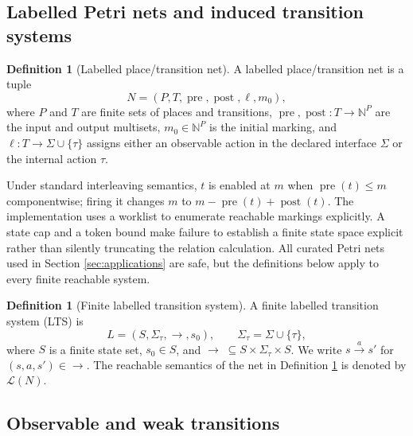 \documentclass[JMCS,submit]{resources/ISRP}
\theoremstyle{definition}
\newtheorem{definition}[theorem]{Definition}
\theoremstyle{remark}
\numberwithin{equation}{section}
\newcommand{\TAU}{\tau}
\newcommand{\LTS}{\mathcal{L}}
\begin{document}
\subsection{Labelled Petri nets and induced transition systems}
\label{sec:petri}

\begin{definition}[Labelled place/transition net]\label{def:petri-net}
A labelled place/transition net is a tuple
\begin{equation}\label{eq:petri-net}
 N=(P,T,\operatorname{pre},\operatorname{post},\ell,m_0),
\end{equation}
where $P$ and $T$ are finite sets of places and transitions,
$\operatorname{pre},\operatorname{post}:T\to\mathbb{N}^{P}$ are the input and
output multisets, $m_0\in\mathbb{N}^{P}$ is the initial marking, and
$\ell:T\to\Sigma\cup\{\TAU\}$ assigns either an observable action in the declared
interface $\Sigma$ or the internal action $\TAU$.
\end{definition}

Under standard interleaving semantics, $t$ is enabled at $m$ when
$\operatorname{pre}(t)\leq m$ componentwise; firing it changes $m$ to
$m-\operatorname{pre}(t)+\operatorname{post}(t)$. The implementation uses
a worklist to enumerate reachable markings explicitly. A state cap and a token
bound make failure to establish a finite state space explicit rather than silently
truncating the relation calculation. All curated Petri nets used in Section
\ref{sec:applications} are safe, but the definitions below apply to every finite
reachable system.

\begin{definition}[Finite labelled transition system]\label{def:lts}
A finite labelled transition system (LTS) is
\begin{equation}\label{eq:lts}
 L=(S,\Sigma_{\TAU},\longrightarrow,s_0),\qquad
 \Sigma_{\TAU}=\Sigma\cup\{\TAU\},
\end{equation}
where $S$ is a finite state set, $s_0\in S$, and
$\longrightarrow\;\subseteq S\times\Sigma_{\TAU}\times S$. We write
$s\xrightarrow{a}s'$ for $(s,a,s')\in\longrightarrow$. The reachable semantics
of the net in Definition \ref{def:petri-net} is denoted by $\LTS(N)$.
\end{definition}

\subsection{Observable and weak transitions}\label{sec:weak-transitions}
\end{document}
